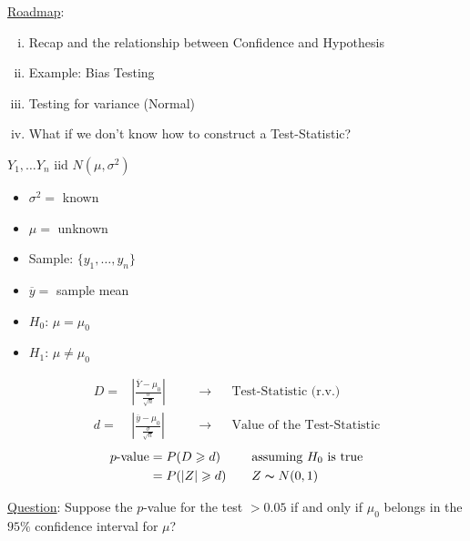 \underline{Roadmap}:
\begin{enumerate}[(i)]
    \item Recap and the relationship between Confidence and Hypothesis
    \item Example: Bias Testing
    \item Testing for variance (Normal)
    \item What if we don't know how to construct a Test-Statistic?
\end{enumerate}

\begin{exbox}
    \begin{example}
        $ Y_1,\ldots Y_n $ iid $ N(\mu,\sigma^2) $
        \begin{itemize}
            \item $ \sigma^2= $ known
            \item $ \mu= $ unknown
            \item Sample: $ \{y_1,\ldots ,y_n\} $
            \item $ \overline{y}= $ sample mean
            \item $ H_0 $: $ \mu=\mu_0 $
            \item $ H_1 $: $ \mu \neq \mu_0 $
        \end{itemize}
        \[
            \begin{aligned}
                D= & \left|\frac{\overline{Y}-\mu_0}{\frac{\sigma}{\sqrt{n}}} \right|
                   & \quad                                                            & \rightarrow &  & \text{Test-Statistic (r.v.)}       \\
                d= & \left|\frac{\overline{y}-\mu_0}{\frac{\sigma}{\sqrt{n}}} \right|
                   &                                                                  & \rightarrow &  & \text{Value of the Test-Statistic}
            \end{aligned}
        \]
        \[
            \begin{aligned}
                p\text{-value}
                 & =P(D\geqslant d)   & \quad & \text{assuming }H_0\text{ is true} \\
                 & =P(|Z|\geqslant d) &       & Z \thicksim N(0,1)
            \end{aligned}
        \]
    \end{example}
\end{exbox}
\underline{Question}: Suppose the $ p $-value for the test $ >0.05 $
if and only if $ \mu_0 $ belongs in the $ 95\% $ confidence interval for $ \mu $?

